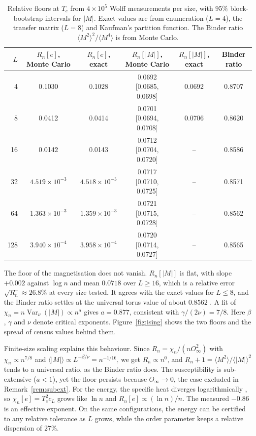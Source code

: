 \documentclass[ba]{imsart}
\theoremstyle{plain}
\theoremstyle{definition}
\newcommand{\Var}{\operatorname{Var}}
\begin{document}
\begin{table}[t]
\centering
\caption{Relative floors at $T_c$ from $4\times10^5$ Wolff measurements per size, with 95\% block-bootstrap intervals for $|M|$. Exact values are from enumeration ($L=4$), the transfer matrix ($L=8$) and Kaufman's partition function. The Binder ratio $\langle M^2\rangle^2/\langle M^4\rangle$ is from Monte Carlo.}
\label{tab:ising}
\footnotesize
\setlength{\tabcolsep}{3pt}
\begin{tabular}{rccccc}
\toprule
$L$ & $R_n[e]$, Monte Carlo & $R_n[e]$, exact & $R_n[|M|]$, Monte Carlo & $R_n[|M|]$, exact & Binder ratio\\
\midrule
4   & 0.1030 & 0.1028 & 0.0692 [0.0685, 0.0698] & 0.0692 & 0.8707\\
8   & 0.0412 & 0.0414 & 0.0701 [0.0694, 0.0708] & 0.0706 & 0.8620\\
16  & 0.0142 & 0.0143 & 0.0712 [0.0704, 0.0720] & -- & 0.8586\\
32  & $4.519\times10^{-3}$ & $4.518\times10^{-3}$ & 0.0717 [0.0710, 0.0725] & -- & 0.8571\\
64  & $1.363\times10^{-3}$ & $1.359\times10^{-3}$ & 0.0721 [0.0715, 0.0728] & -- & 0.8562\\
128 & $3.940\times10^{-4}$ & $3.958\times10^{-4}$ & 0.0720 [0.0714, 0.0727] & -- & 0.8565\\
\bottomrule
\end{tabular}
\end{table}

The floor of the magnetisation does not vanish. $R_n[|M|]$ is flat, with slope $+0.002$ against $\log n$ and mean $0.0718$ over $L\ge16$, which is a relative error $\sqrt{R_n}\approx26.8\%$ at every size tested. It agrees with the exact values for $L\le8$, and the Binder ratio settles at the universal torus value of about $0.8562$ \citep{SalasSokal2000}. A fit of $\chi_n=n\Var_\nu(|M|)\propto n^a$ gives $a=0.877$, consistent with $\gamma/(2\nu)=7/8$. Here $\beta$, $\gamma$ and $\nu$ denote critical exponents. Figure~\ref{fig:ising} shows the two floors and the spread of census values behind them.

Finite-size scaling explains this behaviour. Since $R_n=\chi_n/(nO_\infty^2)$ with $\chi_n\propto n^{7/8}$ and $\langle|M|\rangle\propto L^{-\beta/\nu}=n^{-1/16}$, we get $R_n\propto n^0$, and $R_n+1=\langle M^2\rangle/\langle|M|\rangle^2$ tends to a universal ratio, as the Binder ratio does. The susceptibility is sub-extensive ($a<1$), yet the floor persists because $O_\infty\to0$, the case excluded in Remark~\ref{rem:subext}. For the energy, the specific heat diverges logarithmically \citep{FerdinandFisher1969,Onsager1944}, so $\chi_n[e]=T_c^2c_L$ grows like $\ln n$ and $R_n[e]\propto(\ln n)/n$. The measured $-0.86$ is an effective exponent. On the same configurations, the energy can be certified to any relative tolerance as $L$ grows, while the order parameter keeps a relative dispersion of $27\%$.
\end{document}
